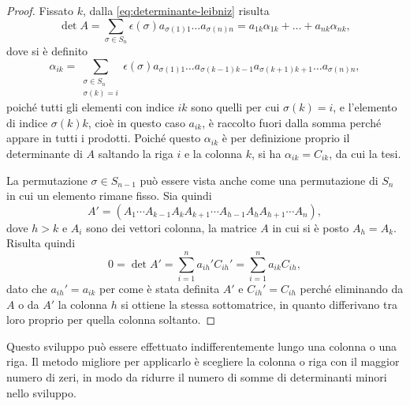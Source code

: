 \begin{proof}
	Fissato $k$, dalla \eqref{eq:determinante-leibniz} risulta
	\begin{equation*}
		\det A=\sum_{\sigma\in S_n}\epsilon(\sigma)a_{\sigma(1)1}\dots a_{\sigma(n)n}=a_{1k}\alpha_{1k}+\dots+a_{nk}\alpha_{nk},
	\end{equation*}
	dove si è definito
	\begin{equation*}
		\alpha_{ik}=\sum_{\substack{\sigma\in S_n\\\sigma(k)=i}}\epsilon(\sigma)a_{\sigma(1)1}\dots a_{\sigma(k-1)k-1}a_{\sigma(k+1)k+1}\dots a_{\sigma(n)n},
	\end{equation*}
	poiché tutti gli elementi con indice $ik$ sono quelli per cui $\sigma(k)=i$, e l'elemento di indice $\sigma(k)k$, cioè in questo caso $a_{ik}$, è raccolto fuori dalla somma perché appare in tutti i prodotti.
	Poiché questo $\alpha_{ik}$ è per definizione proprio il determinante di $A$ saltando la riga $i$ e la colonna $k$, si ha $\alpha_{ik}=C_{ik}$, da cui la tesi.

	La permutazione $\sigma\in S_{n-1}$ può essere vista anche come una permutazione di $S_n$ in cui un elemento rimane fisso. Sia quindi
	\begin{equation*}
		A'=(A_1\cdots A_{k-1}A_kA_{k+1}\cdots A_{h-1}A_hA_{h+1}\cdots A_n),
	\end{equation*}
	dove $h>k$ e $A_i$ sono dei vettori colonna, la matrice $A$ in cui si è posto $A_h=A_k$. Risulta quindi
	\begin{equation*}
		0=\det A'=\sum_{i=1}^na_{ih}'C_{ih}'=\sum_{i=1}^na_{ik}C_{ih},
	\end{equation*}
	dato che $a_{ih}'=a_{ik}$ per come è stata definita $A'$ e $C_{ih}'=C_{ih}$ perché eliminando da $A$ o da $A'$ la colonna $h$ si ottiene la stessa sottomatrice, in quanto differivano tra loro proprio per quella colonna soltanto.
\end{proof}
Questo sviluppo può essere effettuato indifferentemente lungo una colonna o una riga.
Il metodo migliore per applicarlo è scegliere la colonna o riga con il maggior numero di zeri, in modo da ridurre il numero di somme di determinanti minori nello sviluppo.

